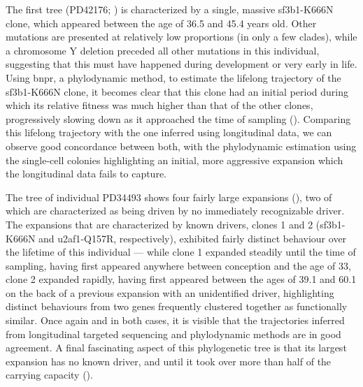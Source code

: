 The first tree (PD42176; ) is characterized by a single, massive \ac{sf3b1}-K666N clone, which appeared between the age of 36.5 and 45.4 years old. Other mutations are presented at relatively low proportions (in only a few clades), while a chromosome Y deletion preceded all other mutations in this individual, suggesting that this must have happened during development or very early in life. Using \ac{bnpr}, a phylodynamic method, to estimate the lifelong trajectory of the \ac{sf3b1}-K666N clone, it becomes clear that this clone had an initial period during which its relative fitness was much higher than that of the other clones, progressively slowing down as it approached the time of sampling (). Comparing this lifelong trajectory with the one inferred using longitudinal data, we can observe good concordance between both, with the phylodynamic estimation using the single-cell colonies highlighting an initial, more aggressive expansion which the longitudinal data fails to capture.

\begin{figure}[!ht]
	\label{fig:tree-pd42176}
\end{figure}

The tree of individual PD34493 shows four fairly large expansions (), two of which are characterized as being driven by no immediately recognizable driver. The expansions that are characterized by known drivers, clones 1 and 2 (\ac{sf3b1}-K666N and \ac{u2af1}-Q157R, respectively), exhibited fairly distinct behaviour over the lifetime of this individual --- while clone 1 expanded steadily until the time of sampling, having first appeared anywhere between conception and the age of 33, clone 2 expanded rapidly, having first appeared between the ages of 39.1 and 60.1 on the back of a previous expansion with an unidentified driver, highlighting distinct behaviours from two genes frequently clustered together as functionally similar. Once again and in both cases, it is visible that the trajectories inferred from longitudinal targeted sequencing and phylodynamic methods are in good agreement. A final fascinating aspect of this phylogenetic tree is that its largest expansion has no known driver, and until it took over more than half of the carrying capacity (). 

